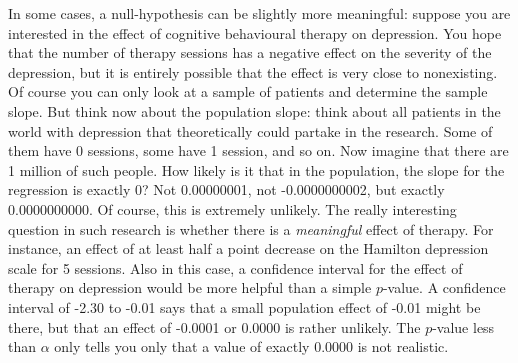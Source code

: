 \documentclass[]{report}\usepackage[]{graphicx}\usepackage[]{color}
\begin{document}
In some cases, a null-hypothesis can be slightly more meaningful: suppose you are interested in the effect of cognitive behavioural therapy on depression. You hope that the number of therapy sessions has a negative effect on the severity of the depression, but it is entirely possible that the effect is very close to nonexisting. Of course you can only look at a sample of patients and determine the sample slope. But think now about the population slope: think about all patients in the world with depression that theoretically could partake in the research. Some of them have 0 sessions, some have 1 session, and so on. Now imagine that there are 1 million of such people. How likely is it that in the population, the slope for the regression is exactly 0? Not 0.00000001, not -0.0000000002, but exactly 0.0000000000. Of course, this is extremely unlikely. The really interesting question in such research is whether there is a \textit{meaningful} effect of therapy. For instance, an effect of at least half a point decrease on the Hamilton depression scale for 5 sessions. Also in this case, a confidence interval for the effect of therapy on depression would be more helpful than a simple $p$-value. A confidence interval of -2.30 to -0.01 says that a small population effect of -0.01 might be there, but that an effect of -0.0001 or 0.0000 is rather unlikely. The $p$-value less than $\alpha$ only tells you only that a value of exactly 0.0000 is not realistic.
\end{document}
